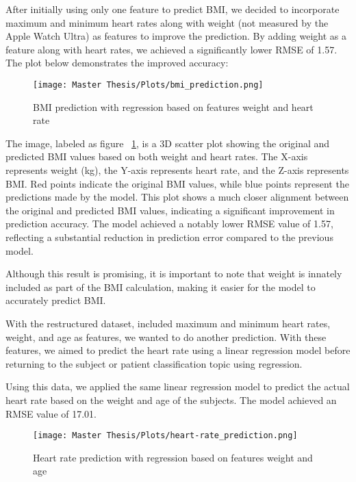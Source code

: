 After initially using only one feature to predict BMI, we decided to incorporate maximum and minimum heart rates along with weight (not measured by the Apple Watch Ultra) as features to improve the prediction. By adding weight as a feature along with heart rates, we achieved a significantly lower RMSE of 1.57. The plot below demonstrates the improved accuracy:

\FloatBarrier
\begin{figure}[h!]
\centering
\texttt{[image: Master Thesis/Plots/bmi\_prediction.png]}
\caption{BMI prediction with regression based on features weight and heart rate}
\label{figure:regwithheartrateweight}
\end{figure}
\FloatBarrier

The image, labeled as figure ~\ref{figure:regwithheartrateweight}, is a 3D scatter plot showing the original and predicted BMI values based on both weight and heart rates. The X-axis represents weight (kg), the Y-axis represents heart rate, and the Z-axis represents BMI. Red points indicate the original BMI values, while blue points represent the predictions made by the model. This plot shows a much closer alignment between the original and predicted BMI values, indicating a significant improvement in prediction accuracy. The model achieved a notably lower RMSE value of 1.57, reflecting a substantial reduction in prediction error compared to the previous model.

Although this result is promising, it is important to note that weight is innately included as part of the BMI calculation, making it easier for the model to accurately predict BMI.

With the restructured dataset, included maximum and minimum heart rates, weight, and age as features, we wanted to do another prediction. With these features, we aimed to predict the heart rate using a linear regression model before returning to the subject or patient classification topic using regression.

Using this data, we applied the same linear regression model to predict the actual heart rate based on the weight and age of the subjects. The model achieved an RMSE value of 17.01.

\FloatBarrier
\begin{figure}[h!]
\centering
\texttt{[image: Master Thesis/Plots/heart-rate\_prediction.png]}
\caption{Heart rate prediction with regression based on features weight and age}
\label{figure:HRregwithweightage}
\end{figure}
\FloatBarrier

